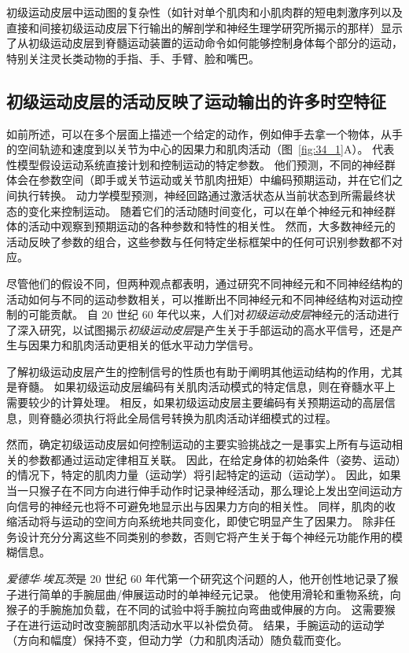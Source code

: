 初级运动皮层中运动图的复杂性（如针对单个肌肉和小肌肉群的短电刺激序列以及直接和间接初级运动皮层下行输出的解剖学和神经生理学研究所揭示的那样）显示了从初级运动皮层到脊髓运动装置的运动命令如何能够控制身体每个部分的运动，特别关注灵长类动物的手指、手、手臂、脸和嘴巴。



\subsection{初级运动皮层的活动反映了运动输出的许多时空特征}

如前所述，可以在多个层面上描述一个给定的动作，例如伸手去拿一个物体，从手的空间轨迹和速度到以关节为中心的因果力和肌肉活动（图~\ref{fig:34_1}A）。
代表性模型假设运动系统直接计划和控制运动的特定参数。
他们预测，不同的神经群体会在参数空间（即手或关节运动或关节肌肉扭矩）中编码预期运动，并在它们之间执行转换。
动力学模型预测，神经回路通过激活状态从当前状态到所需最终状态的变化来控制运动。
随着它们的活动随时间变化，可以在单个神经元和神经群体的活动中观察到预期运动的各种参数和特性的相关性。
然而，大多数神经元的活动反映了参数的组合，这些参数与任何特定坐标框架中的任何可识别参数都不对应。


尽管他们的假设不同，但两种观点都表明，通过研究不同神经元和不同神经结构的活动如何与不同的运动参数相关，可以推断出不同神经元和不同神经结构对运动控制的可能贡献。
自 20 世纪 60 年代以来，人们对\textit{初级运动皮层}神经元的活动进行了深入研究，以试图揭示\textit{初级运动皮层}是产生关于手部运动的高水平信号，还是产生与因果力和肌肉活动更相关的低水平动力学信号。


了解初级运动皮层产生的控制信号的性质也有助于阐明其他运动结构的作用，尤其是脊髓。
如果初级运动皮层编码有关肌肉活动模式的特定信息，则在脊髓水平上需要较少的计算处理。
相反，如果初级运动皮层主要编码有关预期运动的高层信息，则脊髓必须执行将此全局信号转换为肌肉活动详细模式的过程。


然而，确定初级运动皮层如何控制运动的主要实验挑战之一是事实上所有与运动相关的参数都通过运动定律相互关联。
因此，在给定身体的初始条件（姿势、运动）的情况下，特定的肌肉力量（运动学）将引起特定的运动（运动学）。
因此，如果当一只猴子在不同方向进行伸手动作时记录神经活动，那么理论上发出空间运动方向信号的神经元也将不可避免地显示出与因果力方向的相关性。
同样，肌肉的收缩活动将与运动的空间方向系统地共同变化，即使它明显产生了因果力。
除非任务设计充分分离这些不同类别的参数，否则它将产生关于每个神经元功能作用的模糊信息。


\textit{爱德华$\cdot$埃瓦茨}是 20 世纪 60 年代第一个研究这个问题的人，他开创性地记录了猴子进行简单的手腕屈曲/伸展运动时的单神经元记录。
他使用滑轮和重物系统，向猴子的手腕施加负载，在不同的试验中将手腕拉向弯曲或伸展的方向。
这需要猴子在进行运动时改变腕部肌肉活动水平以补偿负荷。
结果，手腕运动的运动学（方向和幅度）保持不变，但动力学（力和肌肉活动）随负载而变化。


